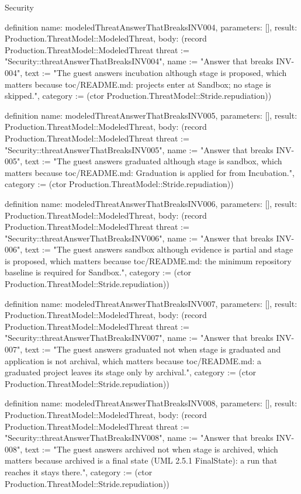 \begin{lexlean}{Security}
\begin{semanticmodule}
definition{
  name: modeledThreatAnswerThatBreaksINV004,
  parameters: [],
  result: Production.ThreatModel::ModeledThreat,
  body: (record Production.ThreatModel::ModeledThreat {threat := "Security::threatAnswerThatBreaksINV004", name := "Answer that breaks INV-004", text := "The guest answers incubation although stage is proposed, which matters because toc/README.md: projects enter at Sandbox; no stage is skipped.", category := (ctor Production.ThreatModel::Stride.repudiation)})
}

definition{
  name: modeledThreatAnswerThatBreaksINV005,
  parameters: [],
  result: Production.ThreatModel::ModeledThreat,
  body: (record Production.ThreatModel::ModeledThreat {threat := "Security::threatAnswerThatBreaksINV005", name := "Answer that breaks INV-005", text := "The guest answers graduated although stage is sandbox, which matters because toc/README.md: Graduation is applied for from Incubation.", category := (ctor Production.ThreatModel::Stride.repudiation)})
}

definition{
  name: modeledThreatAnswerThatBreaksINV006,
  parameters: [],
  result: Production.ThreatModel::ModeledThreat,
  body: (record Production.ThreatModel::ModeledThreat {threat := "Security::threatAnswerThatBreaksINV006", name := "Answer that breaks INV-006", text := "The guest answers sandbox although evidence is partial and stage is proposed, which matters because toc/README.md: the minimum repository baseline is required for Sandbox.", category := (ctor Production.ThreatModel::Stride.repudiation)})
}

definition{
  name: modeledThreatAnswerThatBreaksINV007,
  parameters: [],
  result: Production.ThreatModel::ModeledThreat,
  body: (record Production.ThreatModel::ModeledThreat {threat := "Security::threatAnswerThatBreaksINV007", name := "Answer that breaks INV-007", text := "The guest answers graduated not when stage is graduated and application is not archival, which matters because toc/README.md: a graduated project leaves its stage only by archival.", category := (ctor Production.ThreatModel::Stride.repudiation)})
}

definition{
  name: modeledThreatAnswerThatBreaksINV008,
  parameters: [],
  result: Production.ThreatModel::ModeledThreat,
  body: (record Production.ThreatModel::ModeledThreat {threat := "Security::threatAnswerThatBreaksINV008", name := "Answer that breaks INV-008", text := "The guest answers archived not when stage is archived, which matters because archived is a final state (UML 2.5.1 FinalState): a run that reaches it stays there.", category := (ctor Production.ThreatModel::Stride.repudiation)})
}


\end{semanticmodule}
\end{lexlean}
